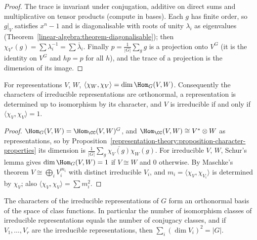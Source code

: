 \begin{proof}
The trace is invariant under conjugation, additive on direct sums and multiplicative on tensor products
(compute in bases). Each $g$ has finite order, so $g|_V$ satisfies $x^n - 1$ and is diagonalisable with roots of
unity $\lambda_i$ as eigenvalues (Theorem~\ref{linear-algebra:theorem-diagonalisable}); then
$\chi_{V^*}(g) = \sum \lambda_i^{-1} = \sum \bar\lambda_i$. Finally $p = \frac{1}{|G|}\sum_g g$ is a projection onto $V^G$
(it is the identity on $V^G$ and $hp = p$ for all $h$), and the trace of a projection is the dimension of its
image.
\end{proof}

\begin{theorem}[Orthogonality]\label{representation-theory:theorem-orthogonality}
For representations $V$, $W$, $\langle \chi_W, \chi_V \rangle = \dim \Hom_G(V, W)$. Consequently the characters of
irreducible representations are orthonormal, a representation is determined up to isomorphism by its
character, and $V$ is irreducible if and only if $\langle \chi_V, \chi_V \rangle = 1$.
\end{theorem}

\begin{proof}
$\Hom_G(V, W) = \Hom_\CC(V, W)^G$, and $\Hom_\CC(V, W) \cong V^* \otimes W$ as representations, so by
Proposition~\ref{representation-theory:proposition-character-properties} its dimension is
$\frac{1}{|G|}\sum_g \overline{\chi_V(g)}\chi_W(g)$. For irreducible $V$, $W$, Schur's lemma gives
$\dim\Hom_G(V, W) = 1$ if $V \cong W$ and $0$ otherwise. By Maschke's theorem $V \cong \bigoplus_i V_i^{m_i}$ with
distinct irreducible $V_i$, and $m_i = \langle \chi_V, \chi_{V_i} \rangle$ is determined by $\chi_V$; also
$\langle \chi_V, \chi_V \rangle = \sum m_i^2$.
\end{proof}

\begin{theorem}\label{representation-theory:theorem-number-irreducibles}
The characters of the irreducible representations of $G$ form an orthonormal basis of the space of class
functions. In particular the number of isomorphism classes of irreducible representations equals the number
of conjugacy classes, and if $V_1, \ldots, V_r$ are the irreducible representations, then
$\sum_i (\dim V_i)^2 = |G|$.
\end{theorem}

